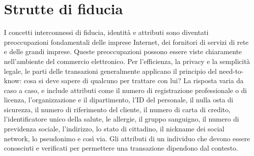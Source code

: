 \section{Strutte di fiducia}

I concetti interconnessi di fiducia, identità e attributi sono diventati preoccupazioni fondamentali delle imprese Internet, dei fornitori di servizi di rete e delle grandi imprese. Queste preoccupazioni possono essere viste chiaramente nell'ambiente del commercio elettronico. Per l'efficienza, la privacy e la semplicità legale, le parti delle transazioni generalmente applicano il principio del need-to-know: cosa si deve sapere di qualcuno per trattare con lui? La risposta varia da caso a caso, e include attributi come il numero di registrazione professionale o di licenza, l'organizzazione e il dipartimento, l'ID del personale, il nulla osta di sicurezza, il numero di riferimento del cliente, il numero di carta di credito, l'identificatore unico della salute, le allergie, il gruppo sanguigno, il numero di previdenza sociale, l'indirizzo, lo stato di cittadino, il nickname dei social network, lo pseudonimo e così via. Gli attributi di un individuo che devono essere conosciuti e verificati per permettere una transazione dipendono dal contesto.

\newpage
